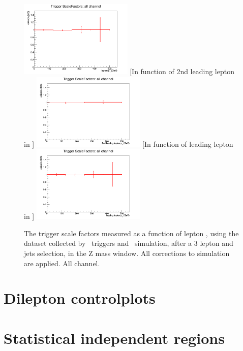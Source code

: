 \begin{figure}[tb]
	[In function of lepton \pt]{
		\includegraphics[width=0.48\textwidth]{Appendix/Figures/trigger/ScaleFactors/all/SF_trigger_allhistPt.png}
		\label{image:allhistPt.png}
	}
	[In function of 2nd leading lepton in \pt]{
		\includegraphics[width=0.48\textwidth]{Appendix/Figures/trigger/ScaleFactors/all/SF_trigger_allhistPt_2ndleadinglep.png}
		\label{image:allhistPt_2ndleadinglep.png}
	}
	[In function of leading lepton in \pt]{
		\includegraphics[width=0.48\textwidth]{Appendix/Figures/trigger/ScaleFactors/all/SF_trigger_allhistPt_leadinglep.png}
		\label{image:allhistPt_leadinglep.png}
	}
	\caption{The trigger scale factors measured as a function of lepton \pt, using the dataset collected by \Etmis\ triggers and \WZ\ simulation, after a 3 lepton and jets selection, in the Z mass window. All corrections to simulation are applied. All channel.}
	\label{image:FigurestriggerScaleFactorsall}
\end{figure}


\chapter{Dilepton controlplots}
\label{app:controldilep}


\chapter{Statistical independent regions}
\label{app:tablestr}